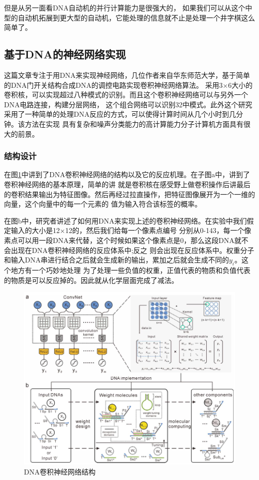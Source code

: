 \documentclass[a4paper,twoside]{article}
\begin{document}
但是从另一面看DNA自动机的并行计算能力是很强大的，
如果我们可以从这个中型的自动机拓展到更大型的自动机，它能处理的信息就不止是处理一个井字棋这么简单了。

\newpage
\subsection{基于DNA的神经网络实现}
这篇文章专注于用DNA来实现神经网络\cite{ref6}，几位作者来自华东师范大学，基于简单的DNA门开关结构合成DNA的调控电路实现卷积神经网络算法。
采用3$\times$6大小的卷积核，可以实现超过八种模式的识别。而且这个卷积神经网络可以与另外一个DNA电路连接，构建分层网络，
这个组合网络可以识别32中模式。此外这个研究采用了一种简单的处理DNA反应的方式，可以使得计算时间从几个小时到几分钟。该方法在实现
具有复杂和噪声分类能力的高计算能力分子计算机方面具有很大的前景。

\subsubsection{结构设计}
在图\ref{dna-cnn-structure}中讲到了DNA卷积神经网络的结构以及它的反应机理。在子图a中，讲到了卷积神经网络的基本原理，简单的讲
就是卷积核在感受野上做卷积操作后讲最后的卷积结果输出为特征图像。然后再经过拉直操作，把特征图像展开为一个一维的向量，这个向量中的每一个元素的
值为输入符合该标签的概率。

在图b中，研究者讲述了如何用DNA来实现上述的卷积神经网络。在实验中我们假定输入的大小是12$\times$12的，然后我们给每一个像素点编号
分别从0-143，每一个像素点可以用一段DNA来代替，这个时候如果这个像素点是0，那么这段DNA就不会出现在DNA卷积神经网络的反应体系中;反之
则会出现在反应体系中。权重分子和输入DNA串进行结合之后就会生成新的输出，累加之后就会生成不同的$y_i$。这个地方有一个巧妙地处理
为了处理一些负值的权重，正值代表的物质和负值代表的物质是可以反应掉的。因此就从化学层面完成了减法。
\begin{figure}[htbp]
	\centering
	\includegraphics[width=0.8\linewidth]{images/dna-cnn-structure.png}
	\caption{DNA卷积神经网络结构}
	\label{dna-cnn-structure}
\end{figure}
\end{document}
